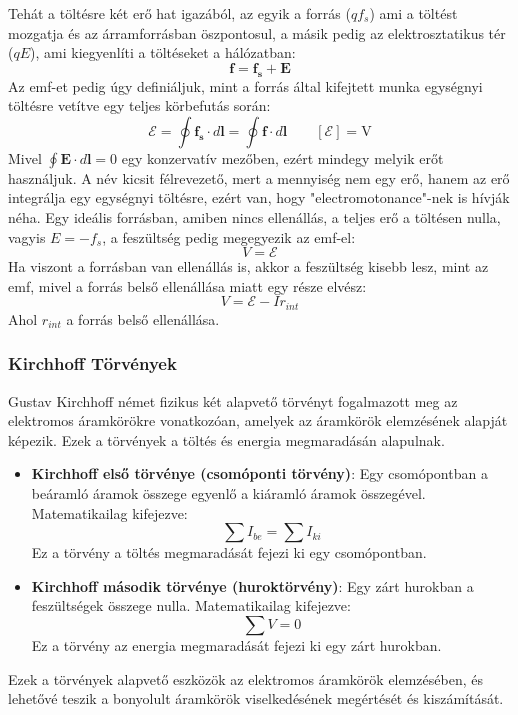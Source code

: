 \documentclass[../main.tex]{subfiles}
\begin{document}
Tehát a töltésre két erő hat igazából, az egyik a forrás ($qf_s$) ami a töltést mozgatja és az árramforrásban öszpontosul, a másik pedig az elektrosztatikus tér ($qE$), ami kiegyenlíti a töltéseket a hálózatban:
\begin{equation}
    \mathbf{f} = \mathbf{f_s} + \mathbf{E}
\end{equation}
Az emf-et pedig úgy definiáljuk, mint a forrás által kifejtett munka egységnyi töltésre vetítve egy teljes körbefutás során:
\begin{equation}
    \boxed{\mathcal{E} = \oint \mathbf{f_s} \cdot d\mathbf{l} = \oint \mathbf{f} \cdot d\mathbf{l}} \qquad \left[\mathcal{E}\right] = \text{V}
\end{equation}
Mivel $\oint \mathbf{E} \cdot d\mathbf{l} = 0$ egy konzervatív mezőben, ezért mindegy melyik erőt használjuk. A név kicsit félrevezető, mert a mennyiség nem egy erő,
hanem az erő integrálja egy egységnyi töltésre, ezért van, hogy "electromotonance"-nek is hívják néha. Egy ideális forrásban, amiben nincs ellenállás, a teljes erő a töltésen nulla, vagyis $E = - f_s$, a feszültség pedig megegyezik az emf-el:
\begin{equation}
    V = \mathcal{E}
\end{equation}
Ha viszont a forrásban van ellenállás is, akkor a feszültség kisebb lesz, mint az emf, mivel a forrás belső ellenállása miatt egy része elvész:
\begin{equation}
    V = \mathcal{E} - Ir_{int}
\end{equation}
Ahol $r_{int}$ a forrás belső ellenállása.

\subsubsection{Kirchhoff Törvények}
Gustav Kirchhoff német fizikus két alapvető törvényt fogalmazott meg az elektromos áramkörökre vonatkozóan, amelyek az áramkörök elemzésének alapját képezik. Ezek a törvények a töltés és energia megmaradásán alapulnak.  
\begin{itemize}
    \item \textbf{Kirchhoff első törvénye (csomóponti törvény)}: Egy csomópontban a beáramló áramok összege egyenlő a kiáramló áramok összegével. Matematikailag kifejezve:
    \begin{equation}
        \sum I_{be} = \sum I_{ki}
    \end{equation}
    Ez a törvény a töltés megmaradását fejezi ki egy csomópontban.
    
    \item \textbf{Kirchhoff második törvénye (huroktörvény)}: Egy zárt hurokban a feszültségek összege nulla. Matematikailag kifejezve:
    \begin{equation}
        \sum V = 0
    \end{equation}
    Ez a törvény az energia megmaradását fejezi ki egy zárt hurokban.
\end{itemize}
Ezek a törvények alapvető eszközök az elektromos áramkörök elemzésében, és lehetővé teszik a bonyolult áramkörök viselkedésének megértését és kiszámítását.
\end{document}
